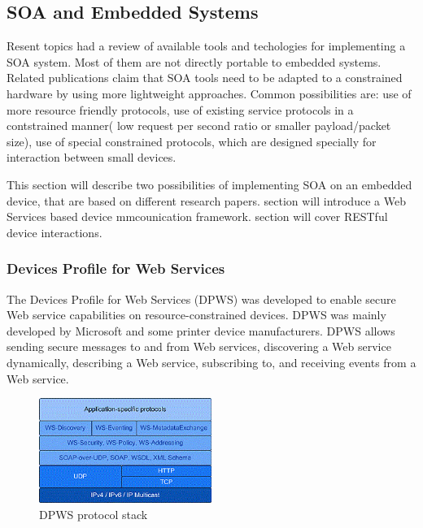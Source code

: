 \subsection{SOA and Embedded Systems}

Resent topics had a review of available tools and techologies for implementing a
\gls{SOA} system. Most of them are not directly portable to embedded systems.
Related publications \cite{5470528, dguinard-rest-vs-ws} claim that SOA
tools need to be adapted to a constrained hardware by using more lightweight approaches.
Common possibilities are: use of more resource friendly protocols, use of
existing service protocols in a contstrained manner( low request per second
ratio or smaller payload/packet size), use of special constrained protocols,
which are designed specially for interaction between small devices.

This section will describe two possibilities of implementing SOA on an embedded
device, that are based on different research
papers\cite{coap_survey,4221180}.
 section will introduce a
Web Services based device mmcounication framework.  section
will cover RESTful device interactions.
\subsubsection{Devices Profile for Web Services}
\label{sec:DPWS}
The Devices Profile for Web Services (DPWS) was developed to enable secure Web
service capabilities on resource-constrained devices\cite{ws4d_dpws}.
DPWS was mainly developed by Microsoft and some printer device manufacturers.
DPWS allows sending secure messages to and from Web services, discovering a Web service dynamically, describing a Web service, subscribing to, and receiving events from a Web service.


\begin{center}
 \begin{figure}[h]
	\includegraphics[width=0.5\textwidth]{../images/background/dpws-stack.png}
	\caption{DPWS protocol stack \cite{ws4d_dpws} }
	\label{fig:dpws_protocol_stack}
 \end{figure}
\end{center}


